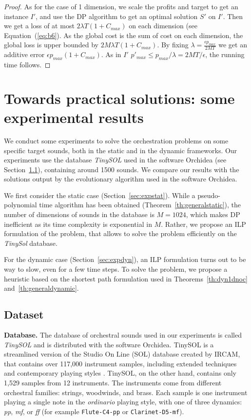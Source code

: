 \documentclass[a4paper]{book}
\newtheorem{proof}{\noindent{\bf Proof.} }
\begin{document}
\begin{proof}
As for the case of 1 dimension, we scale the profits and target to get an instance $I'$, and use the DP algorithm to get an optimal solution $S'$ on $I'$. Then we get a loss of at most $2\lambda T(1+C_{max})$ on each dimension (see Equation~(\ref{eq:b6}). As the global cost is the sum of cost on each dimension, the global loss is upper bounded by $2M\lambda T(1+C_{max})$. By fixing $\lambda=\frac{\epsilon p_{max}}{2MT}$ we get an additive error $\epsilon p_{max}(1+C_{max})$. As in $I'$ $p'_{max}\leq p_{max}/\lambda=2MT/\epsilon$, the running time follows.
\end{proof}

\section{Towards practical solutions: some experimental results}\label{sec:expe}

We conduct some experiments to solve the orchestration problems on some specific target sounds, both in the static and in the dynamic frameworks. Our experiments use the database \emph{TinySOL} used in the software Orchidea (see Section~\ref{sec:dataset}), containing around 1500 sounds.  We compare our results with the solutions output by the evolutionary algorithm used in the software Orchidea.

We first consider the static case (Section~\ref{sec:expstat}). While a pseudo-polynomial time algorithm has been obtained (Theorem~\ref{th:generalstatic}), the number of dimensions of sounds in the database is $M=1024$, which makes DP inefficient as its time complexity is exponential in $M$. Rather, we propose an ILP formulation of the problem, that allows to solve the problem efficiently on the {\it TinySol} database.

For the dynamic case (Section~\ref{sec:expdyn}), an ILP formulation turns out to be way to slow, even for a few time steps. To solve the problem, we propose a heuristic based on the shortest path formulation used in Theorems~\ref{th:dyn1dnoc} and~\ref{th:generaldynamic}.


\subsection{Dataset}
\label{sec:dataset}

{\bf Database.} The database of orchestral sounds used in our experiments is called \emph{TinySOL} and is distributed with the software Orchidea. TinySOL is a streamlined version of the Studio On Line (SOL) database created by IRCAM, that contains over 117,000 instrument samples, including extended techniques and contemporary playing styles \cite{Cella2021}. TinySOL, on the other hand, contains only 1,529 samples from 12 instruments. The instruments come from different orchestral families: strings, woodwinds, and brass. Each sample is one instrument playing a single note in the \emph{ordinario} playing style, with one of three dynamics: \textit{pp}, \textit{mf}, or \textit{ff} (for example \texttt{Flute-C4-pp} or \texttt{Clarinet-D5-mf}). 
\end{document}
